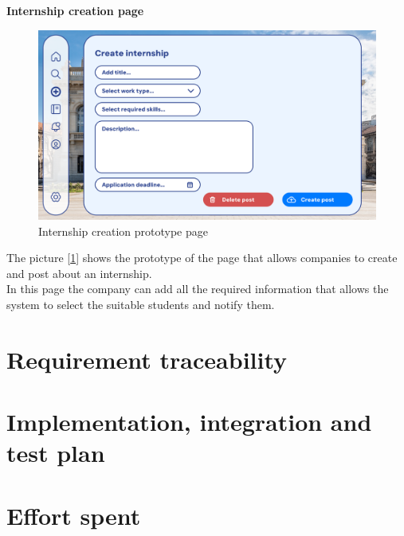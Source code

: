 \documentclass[11pt,twoside]{article}
\begin{document}
\newpage

\large{\textbf{Internship creation page}}
\begin{figure}[H]
\includegraphics[width=\textwidth]{Images/Create internship}
\caption{Internship creation prototype page}\label{Create internship}
\end{figure}
The picture [\ref{Create internship}] shows the prototype of the page that allows companies to create and post about an internship.\\
In this page the company can add all the required information that allows the system to select the suitable students and notify them.

\newpage

\section{Requirement traceability}

\newpage

\section{Implementation, integration and test plan}

\newpage

\section{Effort spent}
\end{document}
